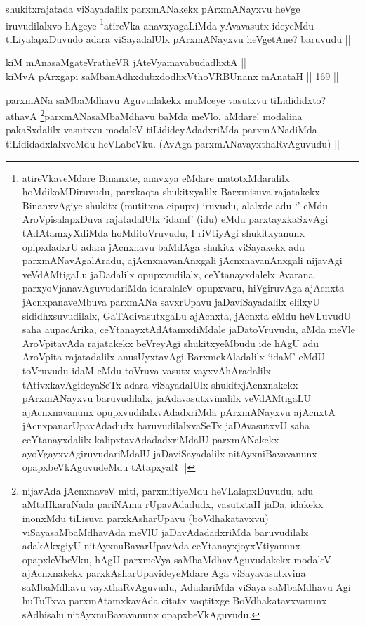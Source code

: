 \begin{artha}
shukitxrajatada viSayadalilx parxmANakekx pArxmANayxvu heVge iruvudilalxvo hAgeye \footnote{atireVkaveMdare Binanxte, anavxya eMdare matotxMdaralilx hoMdikoMDiruvudu, parxkaqta shukitxyalilx Barxmisuva rajatakekx BinanxvAgiye shukitx (mutitxna cipupx) iruvudu, alalxde adu `\stext' eMdu AroVpisalapxDuva rajatadalUlx `idamf' (idu) eMdu parxtayxkaSxvAgi tAdAtamxyXdiMda hoMditoVruvudu, I riVtiyAgi shukitxyanunx opipxdadxrU adara jAcnxnavu baMdAga shukitx viSayakekx adu parxmANavAgalAradu, ajAcnxnavanAnxgali jAcnxnavanAnxgali nijavAgi veVdAMtigaLu jaDadalilx opupxvudilalx, ceYtanayxdalelx Avarana parxyoVjanavAguvudariMda idaralaleV opupxvaru, hiVgiruvAga ajAcnxta jAcnxpanaveMbuva parxmANa savxrUpavu jaDaviSayadalilx elilxyU sididhxsuvudilalx, GaTAdivasutxgaLu ajAcnxta, jAcnxta eMdu heVLuvudU saha aupacArika, ceYtanayxtAdAtamxdiMdale jaDatoVruvudu, aMda meVle AroVpitavAda rajatakekx beVreyAgi shukitxyeMbudu ide hAgU adu AroVpita rajatadalilx anusUyxtavAgi BarxmekAladalilx `idaM' eMdU toVruvudu idaM eMdu toVruva vasutx vayxvAhAradalilx tAtivxkavAgideyaSeTx adara viSayadalUlx shukitxjAcnxnakekx pArxmANayxvu baruvudilalx, jaAdavasutxvinalilx veVdAMtigaLU ajAcnxnavanunx opupxvudilalxvAdadxriMda pArxmANayxvu ajAcnxtA jAcnxpanarUpavAdadudx baruvudilalxvaSeTx jaDAvasutxvU saha ceYtanayxdalilx kalipxtavAdadadxriMdalU parxmANakekx ayoVgayxvAgiruvudariMdalU jaDaviSayadalilx nitAyxniBavavanunx opapxbeVkAguvudeMdu tAtapxyaR ||}atireVka anavxyagaLiMda yAvavasutx ideyeMdu tiLiyalapxDuvudo adara viSayadalUlx pArxmANayxvu heVgetAne? baruvudu ||
\end{artha}


\begin{shl}
kiM mAnasaMgateVratheVR jAteVyamavabudadhxtA || \\
kiMvA pArxgapi saMbanAdhxdubxdodhxV\s thoVR\s BUnanx mAnataH ||  169 ||  
\end{shl}

\begin{artha}
parxmANa saMbaMdhavu Aguvudakekx muMceye vasutxvu tiLidididxto? athavA \footnote{nijavAda jAcnxnaveV miti, parxmitiyeMdu heVLalapxDuvudu, adu aMtaHkaraNada pariNAma rUpavAdadudx, vasutxtaH jaDa, idakekx inonxMdu tiLisuva parxkAsharUpavu (boVdhakatavxvu) viSayasaMbaMdhavAda meVlU jaDavAdadadxriMda baruvudilalx adakAkxgiyU nitAyxnuBavarUpavAda ceYtanayxjoyxVtiyanunx opapxleVbeVku, hAgU parxmeVya saMbaMdhavAguvudakekx modaleV ajAcnxnakekx parxkAsharUpavideyeMdare Aga viSayavasutxvina saMbaMdhavu vayxthaRvAguvudu, AdudariMda viSaya saMbaMdhavu Agi huTuTxva parxmAtamxkavAda citatx vaqtitxge BoVdhakatavxvanunx sAdhisalu nitAyxnuBavavanunx opapxbeVkAguvudu.}parxmANasaMbaMdhavu baMda meVlo, aMdare! modalina pakaSxdalilx vasutxvu modaleV tiLidideyAdadxriMda parxmANadiMda tiLididadxlalxveMdu heVLabeVku. (AvAga parxmANavayxthaRvAguvudu) ||
\end{artha}

